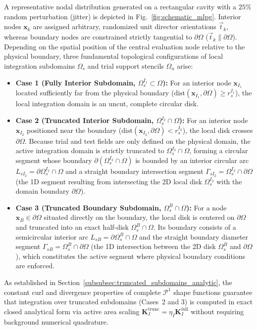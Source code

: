 \documentclass[VANCOUVER,Times1COL]{WileyNJD-v5}
\begin{document}
A representative nodal distribution generated on a rectangular cavity with a $25\%$ random perturbation (jitter) is depicted in Fig.~\ref{fig:schematic_mlpg}. Interior nodes $\mathbf{x}_k$ are assigned arbitrary, randomized unit director orientations $\vec{t}_k$, whereas boundary nodes are constrained strictly tangential to $\partial\Omega$ ($\vec{t}_k \parallel \partial\Omega$). Depending on the spatial position of the central evaluation node relative to the physical boundary, three fundamental topological configurations of local integration subdomains $\Omega_s$ and trial support stencils $\Omega_u$ arise:
\begin{itemize}
    \item \textbf{Case 1 (Fully Interior Subdomain, $\Omega_s^{I_1} \subset \Omega$):} For an interior node $\mathbf{x}_{I_1}$ located sufficiently far from the physical boundary ($\mathrm{dist}(\mathbf{x}_{I_1}, \partial\Omega) \ge r_s^{I_1}$), the local integration domain is an uncut, complete circular disk.
    \item \textbf{Case 2 (Truncated Interior Subdomain, $\Omega_s^{I_2} \cap \Omega$):} For an interior node $\mathbf{x}_{I_2}$ positioned near the boundary ($\mathrm{dist}(\mathbf{x}_{I_2}, \partial\Omega) < r_s^{I_2}$), the local disk crosses $\partial\Omega$. Because trial and test fields are only defined on the physical domain, the active integration domain is strictly truncated to $\Omega_s^{I_2} \cap \Omega$, forming a circular segment whose boundary $\partial(\Omega_s^{I_2} \cap \Omega)$ is bounded by an interior circular arc $L_{sI_2} = \partial\Omega_s^{I_2} \cap \Omega$ and a straight boundary intersection segment $\Gamma_{sI_2} = \Omega_s^{I_2} \cap \partial\Omega$ (the 1D segment resulting from intersecting the 2D local disk $\Omega_s^{I_2}$ with the domain boundary $\partial\Omega$).
    \item \textbf{Case 3 (Truncated Boundary Subdomain, $\Omega_s^B \cap \Omega$):} For a node $\mathbf{x}_B \in \partial\Omega$ situated directly on the boundary, the local disk is centered on $\partial\Omega$ and truncated into an exact half-disk $\Omega_s^B \cap \Omega$. Its boundary consists of a semicircular interior arc $L_{sB} = \partial\Omega_s^B \cap \Omega$ and the straight boundary diameter segment $\Gamma_{sB} = \Omega_s^B \cap \partial\Omega$ (the 1D intersection between the 2D disk $\Omega_s^B$ and $\partial\Omega$), which constitutes the active segment where physical boundary conditions are enforced.
\end{itemize}
As established in Section~\ref{subsubsec:truncated_subdomains_analytic}, the constant curl and divergence properties of complete $\mathcal{P}^1$ shape functions guarantee that integration over truncated subdomains (Cases~2 and 3) is computed in exact closed analytical form via active area scaling $\mathbf{K}_I^{\mathrm{trunc}} = \eta_I \mathbf{K}_I^{\mathrm{full}}$ without requiring background numerical quadrature.
\end{document}
